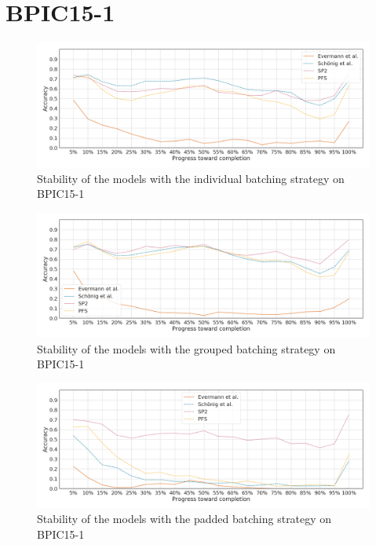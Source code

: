 \section*{BPIC15-1}
\begin{figure}[!htb]
    \centering
    \includegraphics[width=\textwidth]{gfx/bpic2015_1/individual_stability.png}
    \caption{Stability of the models with the individual batching strategy on BPIC15-1}
    \label{fig:bpic15-1-individual-stability}
\end{figure}
\begin{figure}[!htb]
    \centering
    \includegraphics[width=\textwidth]{gfx/bpic2015_1/grouped_stability.png}
    \caption{Stability of the models with the grouped batching strategy on BPIC15-1}
    \label{fig:bpic15-1-grouped-stability}
\end{figure}
\begin{figure}[!htb]
    \centering
    \includegraphics[width=\textwidth]{gfx/bpic2015_1/padded_stability.png}
    \caption{Stability of the models with the padded batching strategy on BPIC15-1}
    \label{fig:bpic15-1-padded-stability}
\end{figure}
